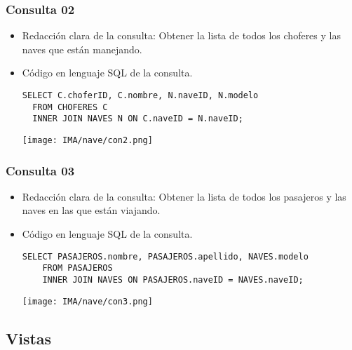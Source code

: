 \subsubsection*{Consulta 02}

\begin{itemize} 
  \item Redacción clara de la consulta: Obtener la lista de todos los choferes y las naves que están manejando. 
  \item Código en lenguaje SQL de la consulta.

  \begin{lstlisting}[caption={Consulta de choferes y naves}, label={lst:sql_estadios}]
  SELECT C.choferID, C.nombre, N.naveID, N.modelo
  FROM CHOFERES C
  INNER JOIN NAVES N ON C.naveID = N.naveID;
  \end{lstlisting}    

    \begin{center}
      \texttt{[image: IMA/nave/con2.png]}
    \end{center}
    
\end{itemize}


\subsubsection*{Consulta 03}

\begin{itemize}
    \item Redacción clara de la consulta: Obtener la lista de todos los pasajeros y las naves en las que están viajando.
    \item Código en lenguaje SQL de la consulta.
    
    \begin{lstlisting}[caption={Tablas para la BdDatos}, label={lst:sql_estadios}]
    SELECT PASAJEROS.nombre, PASAJEROS.apellido, NAVES.modelo
    FROM PASAJEROS
    INNER JOIN NAVES ON PASAJEROS.naveID = NAVES.naveID;
    \end{lstlisting}    

    \begin{center}
      \texttt{[image: IMA/nave/con3.png]}
    \end{center}
    
\end{itemize}


\subsection{Vistas}


